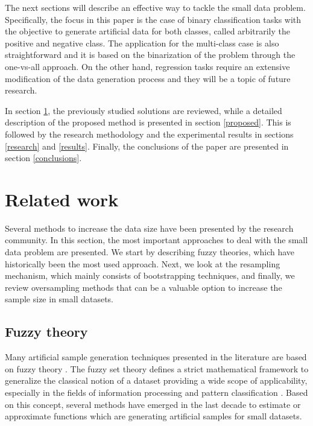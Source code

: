 The next sections will describe an effective way to tackle the small data
problem. Specifically, the focus in this paper is the case of binary classification tasks with the objective to generate artificial data for both classes, called arbitrarily the positive and negative class. The application for the multi-class case is also straightforward and it is based on the binarization of the problem through the one-vs-all approach. On the other hand, regression tasks require an extensive modification of the data generation process and they will be a topic of future research. 

In section \ref{related}, the previously studied solutions are reviewed, while a detailed description of the proposed method is presented in section \ref{proposed}. This is followed by the research methodology and the experimental results in sections \ref{research} and \ref{results}. Finally, the conclusions of the paper are presented in section \ref{conclusions}.

\section{Related work}
\label{related}

Several methods to increase the data size have been presented by the research community. In this section, the most important approaches to deal with the small data problem are presented. We start by describing fuzzy theories, which have historically been the most used approach. Next, we look at the resampling mechanism, which mainly consists of bootstrapping techniques, and finally, we review oversampling methods that can be a valuable option to increase the sample size in small datasets.

\subsection{Fuzzy theory}

Many artificial sample generation techniques presented in the literature are based on fuzzy theory \cite{AbdulLateh.2017}. The fuzzy set theory defines a strict mathematical framework to generalize the classical notion of a dataset providing a wide scope of applicability, especially in the fields of information processing and pattern classification \cite{Zimmermann.2010}. Based on this concept, several methods have emerged in the last decade to estimate or approximate functions which are generating artificial samples for small datasets.

